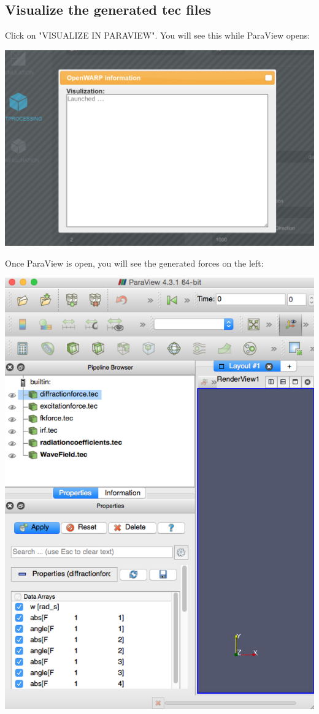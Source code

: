 \documentclass[12pt]{article}
\begin{document}
\subsection{Visualize the generated tec files}

Click on "VISUALIZE IN PARAVIEW".
You will see this while ParaView opens:

\vspace{\abovedisplayskip}
\begin{minipage}{\linewidth}
	\centering
	\includegraphics[scale=0.5]{img/55}
\end{minipage}
\vspace{\belowdisplayskip}

Once ParaView is open, you will see the generated forces on the left:

\vspace{\abovedisplayskip}
\begin{minipage}{\linewidth}
	\centering
	\includegraphics[scale=0.7]{img/56}
\end{minipage}
\vspace{\belowdisplayskip}
\end{document}
